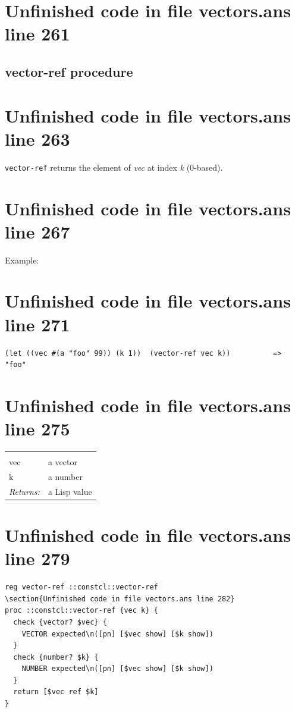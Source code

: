 \documentclass[twoside,9pt]{report}
\begin{document}
\section{Unfinished code in file vectors.ans line 261}
\subsection{vector-ref procedure}
\label{vector-ref-procedure}
\section{Unfinished code in file vectors.ans line 263}


\texttt{vector-ref} returns the element of \emph{vec} at index \emph{k} (0-based).

\section{Unfinished code in file vectors.ans line 267}


Example:

\section{Unfinished code in file vectors.ans line 271}
\begin{verbatim}
(let ((vec #(a "foo" 99)) (k 1))  (vector-ref vec k))          =>  "foo"
\end{verbatim}
\section{Unfinished code in file vectors.ans line 275}
\noindent\begin{tabular}{ |p{1.9cm} p{8cm}| }
\hline
\rowcolor[HTML]{CCCCCC} \multicolumn{2}{|l|}{\bf vector-ref (public)} \\
vec & a vector \\
k & a number \\
\textit{Returns:} & a Lisp value \\
\hline
\end{tabular}
\section{Unfinished code in file vectors.ans line 279}
\begin{lstlisting}
reg vector-ref ::constcl::vector-ref
\section{Unfinished code in file vectors.ans line 282}
proc ::constcl::vector-ref {vec k} {
  check {vector? $vec} {
    VECTOR expected\n([pn] [$vec show] [$k show])
  }
  check {number? $k} {
    NUMBER expected\n([pn] [$vec show] [$k show])
  }
  return [$vec ref $k]
}
\end{lstlisting}
\end{document}
